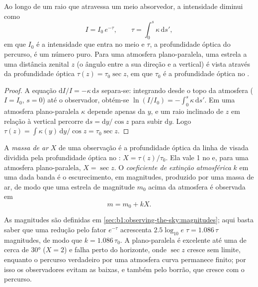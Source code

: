 \begin{proposition}\label{prop:b1:observing-the-sky:bouguer}
Ao longo de um raio que atravessa um meio absorvedor, a intensidade diminui como
\[
  I = I_0\,e^{-\tau}, \qquad \tau = \int_0^s \kappa\,\mathrm ds' ,
\]
em que $I_0$ é a intensidade que entra no meio e $\tau$, a profundidade óptica do percurso, é um número puro.
Para uma atmosfera plano-paralela, uma estrela a uma distância zenital $z$ (o ângulo entre a sua direção e a vertical) é vista através da profundidade óptica $\tau(z) = \tau_0\sec z$, em que $\tau_0$ é a profundidade óptica no .
\end{proposition}

\begin{proof}
A equação $\mathrm dI/I = -\kappa\,\mathrm ds$ separa-se: integrando desde o topo da atmosfera ($I = I_0$, $s = 0$) até o observador, obtém-se $\ln(I/I_0) = -\int_0^s\kappa\,\mathrm ds'$. Em uma atmosfera plano-paralela $\kappa$ depende apenas da  $y$, e um raio inclinado de $z$ em relação à vertical percorre $\mathrm ds = \mathrm dy/\cos z$ para subir $\mathrm dy$. Logo $\tau(z) = \int \kappa(y)\,\mathrm dy/\cos z = \tau_0\sec z$.
\end{proof}

\begin{definition}\label{def:b1:observing-the-sky:extinction}
A \emph{massa de ar} $X$ de uma observação é a profundidade óptica da linha de visada dividida pela profundidade óptica no :
$X = \tau(z)/\tau_0$. Ela vale 1 no  e, para uma atmosfera plano-paralela, $X = \sec z$. O \emph{coeficiente de extinção atmosférica} $k$ em uma dada banda é o escurecimento, em magnitudes, produzido por uma massa de ar, de modo que uma estrela de magnitude $m_0$ acima da atmosfera é observada em
\[
  m = m_0 + kX .
\]
\end{definition}

As magnitudes são definidas em \cref{sec:b1:observing-the-sky:magnitudes}; aqui basta saber que uma redução pelo fator $e^{-\tau}$ acrescenta $2.5\log_{10}e\;\tau = 1.086\,\tau$ magnitudes, de modo que $k = 1.086\,\tau_0$. A  plano-paralela é excelente até uma  de cerca de \ang{30} ($X = 2$) e falha perto do horizonte, onde $\sec z$ cresce sem limite, enquanto o percurso verdadeiro por uma atmosfera curva permanece finito; por isso os observadores evitam as  baixas, e também pelo borrão, que cresce com o percurso.


